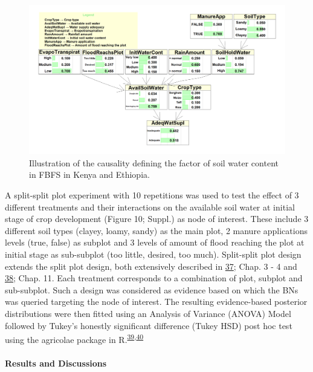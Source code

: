 \documentclass[11pt,preprint]{article}
\begin{document}
\begin{figure}[!htbp]
    \centering
    \includegraphics{figures/190428_CHART_Avail_soil_water_Partial}
    \caption{Illustration of the causality defining the factor of soil water content in FBFS in       Kenya and Ethiopia.
    \label{Figure_5}}
\end{figure}

A split-split plot experiment with 10 repetitions was used to test the
effect of 3 different treatments and their interactions on the available
soil water at initial stage of crop development (Figure 10; Suppl.) as
node of interest. These include 3 different soil types (clayey, loamy,
sandy) as the main plot, 2 manure applications levels (true, false) as
subplot and 3 levels of amount of flood reaching the plot at initial
stage as sub-subplot (too little, desired, too much). Split-split plot
design extends the split plot design, both extensively described in
\protect\hyperlink{ref-Gomez_and_Gomez_1984}{37}; Chap. 3 - 4 and
\protect\hyperlink{ref-Panse_and_Sukhatme_1957}{38}; Chap. 11. Each
treatment corresponds to a combination of plot, subplot and sub-subplot.
Such a design was considered as evidence based on which the BNs was
queried targeting the node of interest. The resulting evidence-based
posterior distributions were then fitted using an Analysis of Variance
(ANOVA) Model followed by Tukey's honestly significant difference (Tukey
HSD) post hoc test using the agricolae package in
R.\textsuperscript{\protect\hyperlink{ref-DeMendiburu_2016}{39},\protect\hyperlink{ref-RCoreTeam_2018}{40}}

\hypertarget{results-and-discussions}{%
\paragraph{Results and Discussions}\label{results-and-discussions}}
\end{document}
